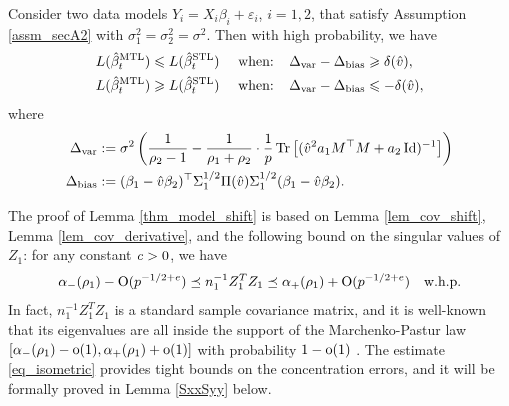 




\begin{lemma}%
\label{thm_model_shift}
Consider two data models $Y_i = X_i\beta_i + \varepsilon_i$, $i=1,2$, that satisfy Assumption \ref{assm_secA2} with $\sigma_1^2=\sigma_2^2=\sigma^2$. Then with high probability, we have
	\begin{align}
	 	L(\hat{\beta}_{t}^{\textup{MTL}}) \leqslant L(\hat{\beta}_t^{\textup{STL}}) \quad \text{ when: } \ \ &\Delta_{\text{var}} - \Delta_{\text{bias}} \geqslant   \delta(\hat v), \label{upper}\\
		L(\hat{\beta}_t^{\textup{MTL}}) \geqslant L(\hat{\beta}_t^{\textup{STL}}) \quad \text{ when: } \ \ &\Delta_{\text{var}} - \Delta_{\text{bias}} \leqslant - \delta(\hat v), \label{lower}
	\end{align}
	where
	\begin{align} %
		\Delta_{\vari} &\define {\sigma^2}\bigbrace{\frac{1}{\rho_2 - 1} -  \frac{1}{\rho_1 + \rho_2}\cdot \frac1p \bigtr{( \hat v^2 a_1 M^{\top}M +  a_2\id)^{-1}} } \label{Deltavarv} \\
		\Delta_{\bias} &\define (\beta_1 - \hat{v}\beta_2)^{\top} \Sigma_1^{1/2} \Pi (\hat v)\Sigma_1^{1/2} (\beta_1 - \hat{v}\beta_2). \label{Deltabetav}
	\end{align}
\end{lemma}

The proof of Lemma \ref{thm_model_shift} is based on Lemma \ref{lem_cov_shift}, Lemma \ref{lem_cov_derivative}, and the following bound on the singular values of $Z_1$: for any constant ${\mathit{c}}>0$, we have
\begin{align}
\alpha_-(\rho_1) - \operatorname{O}(p^{-1/2+e})  \preceq {n_1^{-1}}{Z_1^T Z_1}  \preceq   \alpha_+(\rho_1) + \operatorname{O}(p^{-1/2+e}) \quad \text{w.h.p.}  \label{eq_isometric}
\end{align}
In fact, $n_1^{-1}Z_1^TZ_1$ is a standard sample covariance matrix, and it is well-known that its eigenvalues are all inside the support of the Marchenko-Pastur law $[\alpha_-(\rho_1)-\operatorname{o}(1) ,\alpha_+(\rho_1)+\operatorname{o}(1)]$ with probability $1-\operatorname{o}(1)$ \cite{No_outside}. The estimate \eqref{eq_isometric} provides tight bounds on the concentration errors, and it will be formally proved in Lemma \ref{SxxSyy} below.


